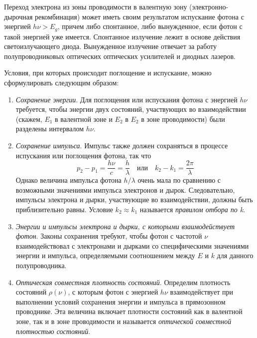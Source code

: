 \documentclass[a4paper, 12pt]{article}
\begin{document}
Переход электрона из зоны проводимости в валентную зону
(электронно-дырочная рекомбинация) может иметь своим результатом
испускание фотона с энергией $h\nu > E_{g}$, причем либо спонтанное,
либо вынужденное, если фотон с такой энергией уже имеется. Спонтанное
излучение лежит в основе действия светоизлучающего диода. Вынужденное
излучение отвечает за работу полупроводниковых оптических оптических
усилителей и диодных лазеров. 

Условия, при которых происходит поглощение и испускание, можно
сформулировать следующим образом:
\begin{enumerate}
    \item \emph{Сохранение энергии}. Для поглощения или испускания
        фотона с энергией $h\nu$ требуется, чтобы энергии двух
        состояний, участвующих во взаимодействии (скажем, $E_{1}$ в
        валентной зоне и $E_{2}$ в $E_{2}$ в зоне проводимости) были
        разделены интервалом $h\nu$.
    \item \emph{Сохранение импульса}. Импульс также должен сохраняться
        в процессе испускания или поглощения фотона, так что
        \[
            p_{2}-p_{1}= \frac{h\nu}{c}= \frac{h}{\lambda}
            \hspace{1em} или \hspace{1em} k_{2}-k_{1}=
            \frac{2\pi}{\lambda}
        \]
        Однако величина импульса фотона $h/\lambda$ очень мала по
        сравнению с возможными значениями импульса электронов и дырок.
        Следовательно, импульсы электрона и дырки, участвующие во
        взаимодействии, должны быть приблизительно равны. Условие
        $k_{2}\approx k_{1}$ называется \emph{правилом отбора по k}. 
    \item \emph{Энергии и импульсы электрона и дырки, с которыми
        взаимодействует фотон}. Законы сохранения требуют, чтобы фотон
        с частотой $\nu$ взаимодействовал с электронами и дырками со
        специфическими значениями энергии и импульса, определяемыми
        соотношением между $E$ и $k$ для данного полупроводника. 
    \item \emph{Оптическая совместная плотность состояний}. Определим
        плотность состояний $\rho(\nu)$, с которым фотон с энергией
        $h\nu$ взаимодействует при выполнении условий сохранения
        энергии и импульса в прямозонном проводнике. Эта величина
        включает плотности состояний как в валентной зоне, так и в
        зоне проводимости и называется \emph{оптической совместной
        плотностью состояний}. 
\end{enumerate}
\end{document}
